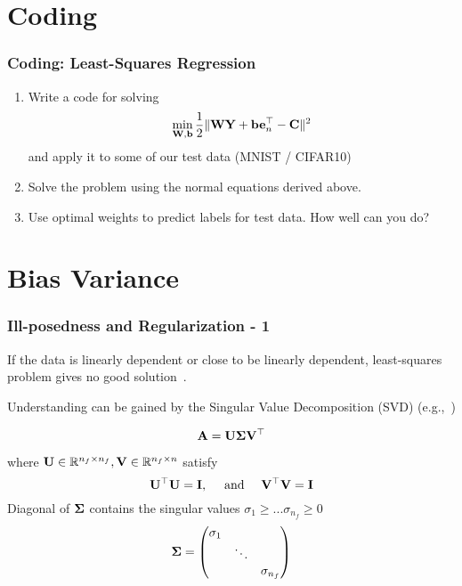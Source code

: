 \documentclass[12pt,fleqn,beamer]{beamer}
\begin{document}
\section{Coding} %
\label{sec:coding}
\begin{frame}
	\frametitle{Coding: Least-Squares Regression}
	
	\begin{enumerate}
		\item Write a code for solving
		$$
		\min_{{\bf W},{\bf b}} {\frac 12}\| {\bf W}{\bf Y} + {\bf b} {\bf e}_n^\top - {\bf C} \|^2
		$$
		and apply it to some of our test data (MNIST / CIFAR10)
		
		\item Solve the problem using the normal equations derived above.
		
		\item Use optimal weights to predict labels for test data. How well can you do?
		
	\end{enumerate}
	
	\bigskip
	
\end{frame}

\section{Bias Variance} %
\label{sec:bias_variance}

\begin{frame}\frametitle{Ill-posedness and Regularization - 1}

If the data is linearly dependent or close to be linearly dependent, least-squares problem gives no good solution~\cite{Hansen1998,Vogel2002,Hansen2010}.

Understanding can be gained by the Singular Value Decomposition (SVD) (e.g.,~\cite[Ch. 8]{AscherGreif2011})

$$ {\bf A} = {\bf U} {\boldsymbol \Sigma} {\bf V}^{\top} $$

where ${\bf U} \in \mathbb{R}^{n_f\times n_f}, {\bf V}\in\mathbb{R}^{n_f \times n}$ satisfy
$$  {\bf U}^{\top} {\bf U} = {\bf I}, \quad \text{ and } \quad {\bf V}^{\top} {\bf V} = {\bf I} $$
Diagonal of ${\boldsymbol \Sigma}$ contains the singular values $\sigma_1 \geq ... \sigma_{n_f} \geq 0 $
$$ {\boldsymbol \Sigma} = \begin{pmatrix} \sigma_1  &  &  \\ &  \ddots &  \\ &  &  \sigma_{n_f} \end{pmatrix} $$

\end{frame}
\end{document}
